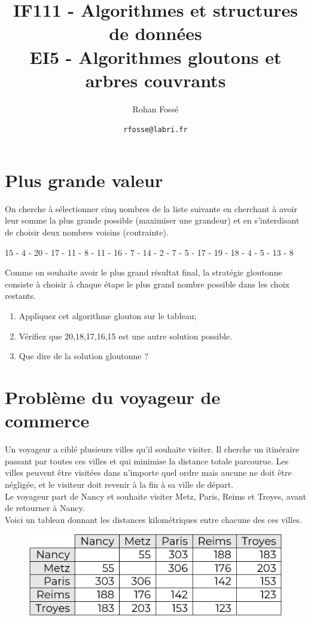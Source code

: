 \documentclass{article}[12pt]
\title{IF111 - Algorithmes et structures de données\\EI5 - Algorithmes gloutons et arbres couvrants}
\date{\texttt{rfosse@labri.fr}}
\author{Rohan Fossé}
\begin{document}
\maketitle{}

\section*{Plus grande valeur}

On cherche à sélectionner cinq nombres de la liste suivante en cherchant à avoir leur somme la plus grande possible (maximiser une grandeur) et en s'interdisant de choisir deux nombres voisins (contrainte).\\

\begin{center}
  15 - 4 - 20 - 17 - 11 - 8 - 11 - 16 - 7 - 14 - 2 - 7 - 5 - 17 - 19 - 18 - 4 - 5 - 13 - 8\\  
\end{center}


Comme on souhaite avoir le plus grand résultat final, la stratégie gloutonne consiste à choisir à chaque étape le plus grand nombre possible dans les choix restants.
\begin{enumerate}
    \item Appliquez cet algorithme glouton sur le tableau;
    \item Vérifiez que {20,18,17,16,15} est une autre solution possible.
    \item Que dire de la solution gloutonne ?
\end{enumerate}

\section*{Problème du voyageur de commerce}

Un voyageur a ciblé plusieurs villes qu'il souhaite visiter. Il cherche un itinéraire passant par toutes ces villes et qui minimise la distance totale parcourue. Les villes peuvent être visitées dans n'importe quel ordre mais aucune ne doit être négligée, et le visiteur doit revenir à la fin à sa ville de départ.\\

Le voyageur part de Nancy et souhaite visiter Metz, Paris, Reims et Troyes, avant de retourner à Nancy.\\

Voici un tableau donnant les distances kilométriques entre chacune des ces villes.

\begin{figure}[h!]
    \centering
    \includegraphics[scale=0.7]{tableau_voyageur.png}
    \label{fig:my_label}
\end{figure}
\end{document}
